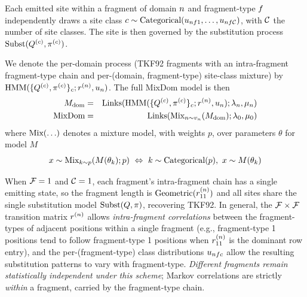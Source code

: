 Each emitted site within a fragment of domain $n$ and fragment-type
$f$ independently draws a site class
$c \sim {\mbox{Categorical}}(u_{nf 1}, \ldots, u_{nf\mathcal{C}})$,
with $\mathcal{C}$ the number of site classes. The site is then governed by
the substitution process ${\mbox{Subst}}(Q^{(c)}, \pi^{(c)})$.

We denote the per-domain process (TKF92 fragments with an intra-fragment
fragment-type chain and per-(domain, fragment-type) site-class mixture) by
${\mbox{HMM}}(\{Q^{(c)},\pi^{(c)}\}_c;r^{(n)},u_n)$.
The full MixDom model is then
\begin{eqnarray*}
  M_{\text{dom}} & = & {\mbox{Links}}({\mbox{HMM}}(\{Q^{(c)},\pi^{(c)}\}_c;r^{(n)},u_n);\lambda_n,\mu_n) \\
  \text{MixDom} & = & {\mbox{Links}}({\mbox{Mix}}_{n\sim v_n}(M_{\text{dom}});\lambda_0,\mu_0)
\end{eqnarray*}
where ${\mbox{Mix}}(\ldots)$ denotes a mixture model, with weights $p$, over parameters $\theta$ for model $M$
\[
x \sim {\mbox{Mix}}_{k\sim p}(M(\theta_k);p)\ \Leftrightarrow\
k \sim {\mbox{Categorical}}(p),\ x \sim M(\theta_k)
\]

\begin{remark}
When $\mathcal{F} = 1$ and $\mathcal{C} = 1$, each fragment's intra-fragment
chain has a single emitting state, so the fragment length is
${\mbox{Geometric}}(r^{(n)}_{11})$ and all sites share the single
substitution model ${\mbox{Subst}}(Q, \pi)$, recovering TKF92.
In general, the $\mathcal{F} \times \mathcal{F}$ transition matrix $r^{(n)}$
allows \emph{intra-fragment correlations} between the fragment-types of
adjacent positions within a single fragment (e.g., fragment-type 1
positions tend to follow fragment-type 1 positions when $r^{(n)}_{11}$
is the dominant row entry), and the per-(fragment-type) class distributions
$u_{nfc}$ allow the resulting substitution patterns
to vary with fragment-type.
\emph{Different fragments remain statistically independent under this scheme};
Markov correlations are strictly \emph{within} a fragment, carried by the
fragment-type chain.
\end{remark}

